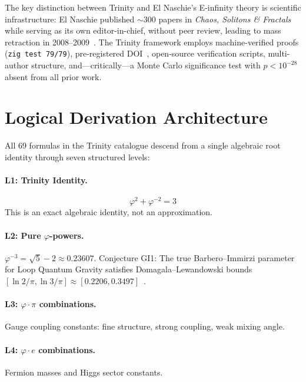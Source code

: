 \documentclass[10pt,a4paper]{article}
\begin{document}
The key distinction between Trinity and El Naschie's E-infinity theory is scientific
infrastructure: El Naschie published $\sim 300$ papers in \textit{Chaos, Solitons \& Fractals}
while serving as its own editor-in-chief, without peer review, leading to mass retraction
in 2008--2009~\cite{naschie1979}. The Trinity framework employs
machine-verified proofs (\texttt{zig test 79/79}), pre-registered DOI~\cite{trinity2024},
open-source verification scripts, multi-author structure, and---critically---a Monte Carlo
significance test with $p < 10^{-28}$ absent from all prior work.

\medskip

\section*{Logical Derivation Architecture}

All 69 formulas in the Trinity catalogue descend from a single algebraic root identity through
seven structured levels:

\paragraph{L1: Trinity Identity.}
\begin{equation}
  \varphi^2 + \varphi^{-2} = 3 \label{eq:trinity}
\end{equation}
This is an exact algebraic identity, not an approximation.

\paragraph{L2: Pure $\varphi$-powers.}
$\varphi^{-3} = \sqrt{5} - 2 \approx 0.23607$.
Conjecture GI1: The true Barbero--Immirzi parameter for Loop Quantum Gravity satisfies
Domagala--Lewandowski bounds
$[\ln 2/\pi, \ln 3/\pi] \approx [0.2206, 0.3497]$~\cite{meissner2004}.

\paragraph{L3: $\varphi\cdot\pi$ combinations.}
Gauge coupling constants: fine structure, strong coupling, weak mixing angle.

\paragraph{L4: $\varphi\cdot e$ combinations.}
Fermion masses and Higgs sector constants.
\end{document}
